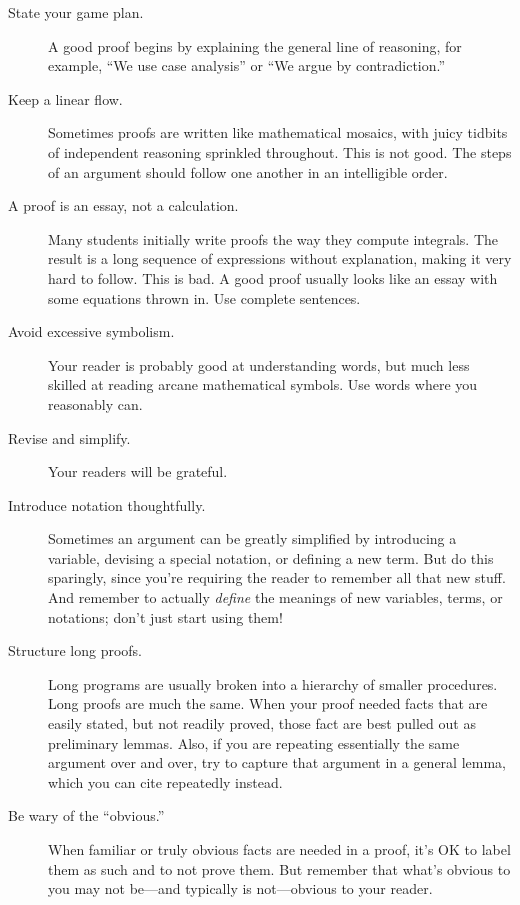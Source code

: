 \begin{description}

\item[State your game plan.]  A good proof begins by explaining the
  general line of reasoning, for example, ``We use case analysis'' or ``We
  argue by contradiction.''

\item[Keep a linear flow.]  Sometimes proofs are written like mathematical
  mosaics, with juicy tidbits of independent reasoning sprinkled
  throughout.  This is not good.  The steps of an argument should follow
  one another in an intelligible order.

\item[A proof is an essay, not a calculation.]  Many students initially
  write proofs the way they compute integrals.  The result is a long
  sequence of expressions without explanation, making it very hard to
  follow.  This is bad.  A good proof usually looks like an essay with
  some equations thrown in.  Use complete sentences.

\item[Avoid excessive symbolism.]  Your reader is probably good at
understanding words, but much less skilled at reading arcane
mathematical symbols.  Use words where you reasonably can.

\item[Revise and simplify.]  Your readers will be grateful.

\item[Introduce notation thoughtfully.]  Sometimes an argument can be
greatly simplified by introducing a variable, devising a special
notation, or defining a new term.  But do this sparingly, since you're
requiring the reader to remember all that new stuff.  And remember to
actually \textit{define} the meanings of new variables, terms, or
notations; don't just start using them!

\item[Structure long proofs.]  Long programs are usually broken into a
  hierarchy of smaller procedures.  Long proofs are much the same.
  When your proof needed facts that are easily stated, but not readily
  proved, those fact are best pulled out as preliminary lemmas.
  Also, if you are repeating essentially the same argument over and
  over, try to capture that argument in a general lemma, which you can
  cite repeatedly instead.

\item[Be wary of the ``obvious.'']  When familiar or truly obvious facts
  are needed in a proof, it's OK to label them as such and to not prove
  them.  But remember that what's obvious to you may not be---and
  typically is not---obvious to your reader.


\end{description}
